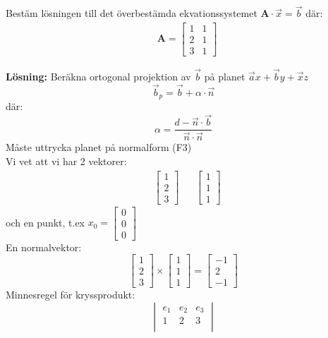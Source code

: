\begin{Ex}
    Bestäm lösningen till det överbestämda ekvationssystemet $\mathbf{A} \cdot \vec{x} = \vec{b}$ där:
    \begin{align*}
    &\mathbf{A} =
    \begin{bmatrix}
        1 & 1 \\
        2 & 1\\
        3 & 1
    \end{bmatrix}
    \end{align*}

    \textbf{Lösning: } Beräkna ortogonal projektion av $\vec{b}$ på planet $\vec{a} x + \vec{b} y+ \vec{x}z$
    \[
        \vec{b}_p = \vec{b} + \alpha \cdot \vec{n}
    \]
    där:
    \[
        \alpha = \frac{d - \vec{n} \cdot \vec{b}}{\vec{n} \cdot \vec{n}}
    \]
    Måste uttrycka planet på normalform (F3)\\
    Vi vet att vi har 2 vektorer:
    \begin{align*}
    &\begin{bmatrix} 1\\2\\3 \end{bmatrix}
    &&\begin{bmatrix} 1\\1\\1 \end{bmatrix}
    \end{align*}
    och en punkt, t.ex $x_0 = \begin{bmatrix} 0\\0\\0 \end{bmatrix}$\\
    En normalvektor:
    \[
        \begin{bmatrix} 1\\2\\3 \end{bmatrix} \times \begin{bmatrix} 1\\1\\1 \end{bmatrix} = \begin{bmatrix} -1\\2\\-1 \end{bmatrix}
    \]
    Minnesregel för kryssprodukt:
    \[
    \begin{vmatrix}
        e_1 & e_2 & e_3\\
        1 & 2 & 3\\

\end{vmatrix}\]
\end{Ex}
